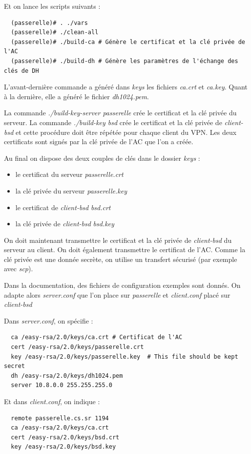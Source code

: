 \documentclass[a4paper]{article}
\begin{document}
Et on lance les scripts suivants :
\begin{verbatim}
  (passerelle)# . ./vars
  (passerelle)# ./clean-all
  (passerelle)# ./build-ca # Génère le certificat et la clé privée de l'AC
  (passerelle)# ./build-dh # Génère les paramètres de l'échange des clés de DH
\end{verbatim}

L'avant-dernière commande a généré dans \textit{keys} les fichiers \textit{ca.crt}
et \textit{ca.key}. Quant à la dernière, elle a généré le fichier \textit{dh1024.pem}.

La commande \textit{./build-key-server passerelle} crée le certificat et la clé privée du serveur.
La commande \textit{./build-key bsd} crée le certificat et la clé privée de \textit{client-bsd} et
cette procédure doit être répétée pour chaque client du VPN.
Les deux certificats sont signés par la clé privée de l'AC que l'on a créée.

Au final on dispose des deux couples de clés dans le dossier \textit{keys} :
\begin{itemize}
  \item le certificat du serveur \textit{passerelle.crt}
  \item la clé privée du serveur \textit{passerelle.key}
  \item le certificat de \textit{client-bsd} \textit{bsd.crt}
  \item la clé privée de \textit{client-bsd} \textit{bsd.key}
\end{itemize}

On doit maintenant transmettre le certificat et la clé privée de \textit{client-bsd}
du serveur au client. On doit également transmettre le certificat de l'AC. 
Comme la clé privée est une donnée secrète, on utilise
un transfert sécurisé (par exemple avec \textit{scp}).

Dans la documentation, des fichiers de configuration exemples sont donnés.
On adapte alors \textit{server.conf} que l'on place sur \textit{passerelle}
et \textit{client.conf} placé sur \textit{client-bsd}

Dans \textit{server.conf}, on spécifie :
\begin{verbatim}
  ca /easy-rsa/2.0/keys/ca.crt # Certificat de l'AC
  cert /easy-rsa/2.0/keys/passerelle.crt
  key /easy-rsa/2.0/keys/passerelle.key  # This file should be kept secret
  dh /easy-rsa/2.0/keys/dh1024.pem
  server 10.8.0.0 255.255.255.0 
\end{verbatim}

Et dans \textit{client.conf}, on indique :
\begin{verbatim}
  remote passerelle.cs.sr 1194
  ca /easy-rsa/2.0/keys/ca.crt
  cert /easy-rsa/2.0/keys/bsd.crt
  key /easy-rsa/2.0/keys/bsd.key
\end{verbatim}
\end{document}
